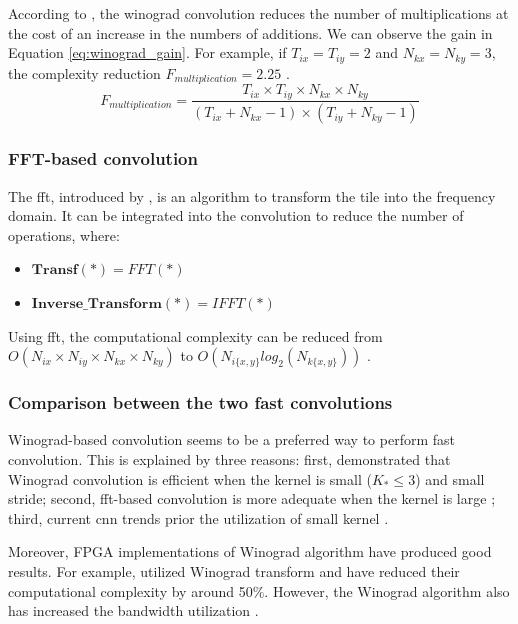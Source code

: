According to \textcite{winograd_arithmetic_1980}, the winograd convolution reduces the number of multiplications at the cost of an increase in the numbers of additions. We can observe the gain in Equation \eqref{eq:winograd_gain}. For example, if $T_{ix} = T_{iy} = 2$ and $N_{kx} = N_{ky} = 3$, the complexity reduction $F_{multiplication} = 2.25$ \cite{lavin_fast_2015}.
%
\begin{equation}
    F_{multiplication} = \frac{T_{ix} \times T_{iy} \times N_{kx} \times N_{ky}}{(T_{ix} + N_{kx} - 1) \times (T_{iy} + N_{ky} - 1)}
    \label{eq:winograd_gain}
\end{equation}
%
\subsubsection{FFT-based convolution}
%
The \acrshort{fft}, introduced by \textcite{cooley_algorithm_1965}, is an algorithm to transform the tile into the frequency domain. It can be integrated into the convolution to reduce the number of operations, where:
\begin{itemize}
    \item $\boldsymbol{Transf(*)} = FFT(*)$
    \item $\boldsymbol{Inverse\_Transform(*)} = IFFT(*)$
\end{itemize}
%
Using \acrshort{fft}, the computational complexity can be reduced from $O(N_{ix} \times N_{iy} \times N_{kx} \times N_{ky})$ to $O(N_{i\{x,y\}} log_2(N_{k\{x,y\}}))$ \cite{w_smith_scientist_1997}.
%
\subsubsection{Comparison between the two fast convolutions}
%
Winograd-based convolution seems to be a preferred way to perform fast convolution. This is explained by three reasons: first, \textcite{lavin_fast_2015} demonstrated that Winograd convolution is efficient when the kernel is small ($K_* \leq 3$) and small stride; second, \acrshort{fft}-based convolution is more adequate when the kernel is large \cite{ahmad_towards_2019, chitsaz_acceleration_2020}; third, current \acrshort{cnn} trends prior the utilization of small kernel \cite{liang_evaluating_2020, sandler_mobilenetv2_2019}.

Moreover, FPGA implementations of Winograd algorithm have produced good results. For example, \cite{aydonat_opencl_2017, liang_evaluating_2020} utilized Winograd transform and have reduced their computational complexity by around 50\%. However, the Winograd algorithm also has increased the bandwidth utilization \cite{xiao_exploring_2017}.

